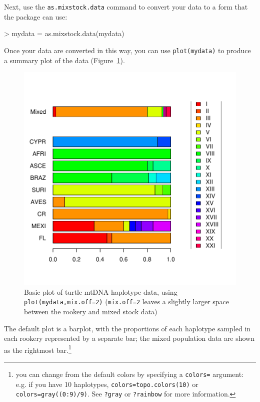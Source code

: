 \documentclass[11pt]{article}
\newcommand{\code}[1]{{\tt #1}}
\begin{document}
Next, use the \code{as.mixstock.data} command
to convert your data to a form that the package can use:
\begin{Schunk}
\begin{Sinput}
> mydata = as.mixstock.data(mydata)
\end{Sinput}
\end{Schunk}

Once your data are converted in this way,
you can use \code{plot(mydata)} to
produce a summary plot of the data
(Figure~\ref{fig:data1}).
\begin{figure}
\includegraphics{mixstock-009}
\caption{Basic plot of turtle mtDNA haplotype data,
using \code{plot(mydata,mix.off=2)}
(\code{mix.off=2} leaves a slightly larger space
between the rookery and mixed stock data)}
\label{fig:data1}
\end{figure}

The default plot is a barplot, with the proportions of each haplotype
sampled in each rookery represented by a separate bar; the mixed
population data are shown as the rightmost bar.\footnote{you can
change from the default colors by specifying a {\tt colors=} argument:
e.g. if you have 10 haplotypes, {\tt colors=topo.colors(10)} or
{\tt colors=gray((0:9)/9)}. See {\tt ?gray} or {\tt ?rainbow} for
more information.}
\end{document}
